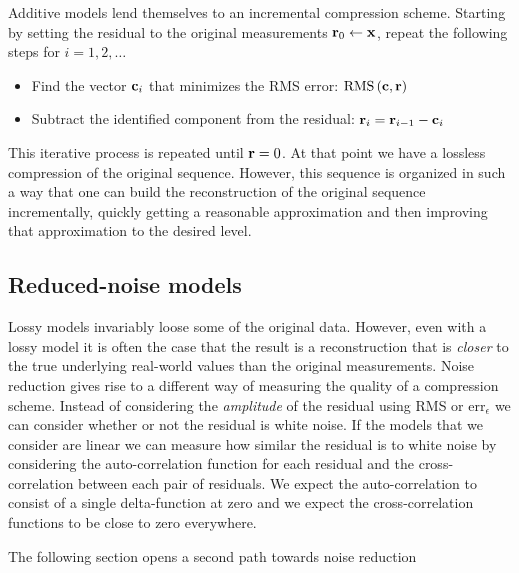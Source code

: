 Additive models lend themselves to an incremental compression
scheme. Starting by setting the residual to the original
measurements $\mathbf{r}_0 \leftarrow \mathbf{x}$, repeat the following steps for
$i=1,2,\ldots$
\begin{itemize}
\item Find the vector $\mathbf{c}_i$ that minimizes the RMS error: 
$\mbox{RMS}\left(\mathbf{c},\mathbf{r} \right)$
\item Subtract the identified component from the residual: $\mathbf{r}_i =
  \mathbf{r}_{i-1}-\mathbf{c}_i$
\end{itemize}
This iterative process is repeated until $\mathbf{r}=0$. At that point we
have a lossless compression of the original sequence. However, this
sequence is organized in such a way that one can build the
reconstruction of the original sequence incrementally, quickly getting
a reasonable approximation and then improving that approximation to
the desired level. 

\subsection{Reduced-noise models}
Lossy models invariably loose some of the original
data. However, even with a lossy model it is often the case that the result is a
reconstruction that is {\em closer} to the true underlying real-world
values than the original measurements. 
Noise reduction gives rise to a different way of measuring
the quality of a compression scheme. Instead of considering the {\em
amplitude} of the residual using RMS or $\mbox{err}_{\epsilon}$ we
can consider whether or not the residual is white noise. If the models
that we consider are linear we can measure how similar the residual is
to white noise by considering the auto-correlation function for each
residual and the cross-correlation between each pair of residuals. We
expect the auto-correlation to consist of a single delta-function at
zero and we expect the cross-correlation functions to be close to zero
everywhere.

The following section opens a second path towards noise reduction

\iffalse
This is possible when the model used for compression captures some
inherent regularity in the data. Consider a temperature guage in a
room that is taking a measurement ten times per second. Suppose also
that each measurement is the sum of the true temperature and gaussian
noise with a standard deviation of one degree.  It is clear that
replacing blocks of 10 consecutive measurements by their average is
lossy in terms of the original signal. However, at the same time, the
averaged sequence is closer to the true measurements. This noise
reduction relies of the assumption that room temperature rarely
changes significantly within a tenth of a second. Therefor any rapid
variations in the measured temperature is likely to be an artifact of
the sensor rather than anything real.
\fi



